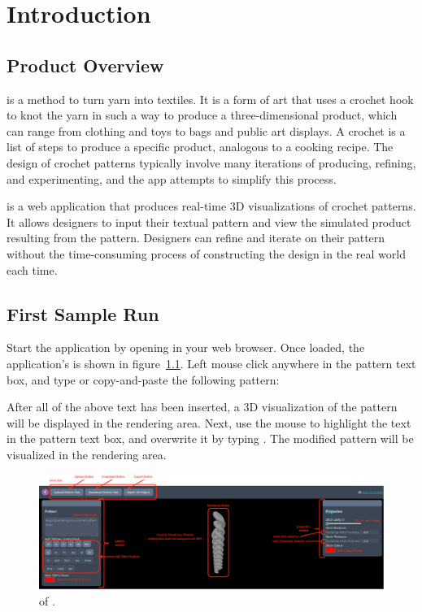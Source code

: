 \documentclass[main.tex]{subfiles}
\begin{document}
\chapter{Introduction}\label{chp:introduction}

\section{Product Overview}

 is a method to turn yarn into textiles. It is a form of art that uses a crochet hook to knot the yarn in such a way to produce a three-dimensional product, which can range from clothing and toys to bags and public art displays.
A crochet  is a list of steps to produce a specific product, analogous to a cooking recipe. The design of crochet patterns typically involve many iterations of producing, refining, and experimenting, and the \CC{} app attempts to simplify this process.

\CC* is a web application that produces real-time 3D visualizations of crochet patterns. It allows designers to input their textual pattern and view the simulated product resulting from the pattern. Designers can refine and iterate on their pattern without the time-consuming process of constructing the design in the real world each time.

\section{First Sample Run}

Start the \CC{} application by opening \href{https://crochetcraft.jtai.ca}{} in your web browser. Once loaded, the application's \ScLayout{} is shown in figure~\ref{fig:layout}. Left mouse click anywhere in the pattern text box, and type or copy-and-paste the following pattern:


After all of the above text has been inserted, a 3D visualization of the pattern will be displayed in the rendering area. Next, use the mouse to highlight the text  in the pattern text box, and overwrite it by typing . The modified pattern will be visualized in the rendering area.

\begin{figure}[htbp]
    \centering
    \includegraphics[width=\linewidth]{layout.png}
    \caption{\ScLayout{} of \CC.}
    \label{fig:layout}
\end{figure}
\end{document}

